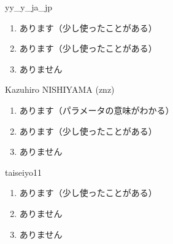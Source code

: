 \begin{prework}{ yy\_y\_ja\_jp }
  \begin{enumerate}
  \item あります（少し使ったことがある）
  \item あります（少し使ったことがある）
  \item ありません
  \end{enumerate}
\end{prework}

\begin{prework}{ Kazuhiro NISHIYAMA (znz) }
  \begin{enumerate}
  \item あります（パラメータの意味がわかる）
  \item あります（少し使ったことがある）
  \item ありません
  \end{enumerate}
\end{prework}

\begin{prework}{ taiseiyo11 }
  \begin{enumerate}
  \item あります（少し使ったことがある）
  \item ありません
  \item ありません
  \end{enumerate}
\end{prework}
